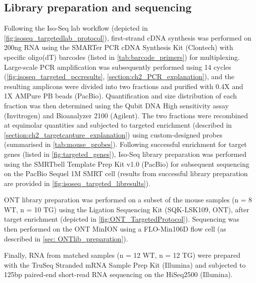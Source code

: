 \subsection{Library preparation and sequencing}
Following the Iso-Seq lab workflow (depicted in \cref{fig:isoseq_targetedlab_protocol}), first-strand cDNA synthesis was performed on 200ng RNA using the SMARTer PCR cDNA Synthesis Kit (Clontech) with specific oligo(dT) barcodes (listed in \cref{tab:barcode_primers}) for multiplexing. Large-scale PCR amplification was subsequently performed using 14 cycles (\cref{fig:isoseq_targeted_pccresults}, \cref{section:ch2_PCR_explanation}), and the resulting amplicons were divided into two fractions and purified with 0.4X and 1X AMPure PB beads (PacBio). Quantification and size distribution of each fraction was then determined using the Qubit DNA High sensitivity assay (Invitrogen) and Bioanalyzer 2100 (Agilent). The two fractions were recombined at equimolar quantities and subjected to targeted enrichment (described in \cref{section:ch2_targetcapture_explanation}) using custom-designed probes (summarised in \cref{tab:mouse_probes}). Following successful enrichment for target genes (listed in \cref{fig:targeted_genes}), Iso-Seq library preparation was performed using the SMRTbell Template Prep Kit v1.0 (PacBio) for subsequent sequencing on the PacBio Sequel 1M SMRT cell (results from successful library preparation are provided in \cref{fig:isoseq_targeted_libresults}). 

ONT library preparation was performed on a subset of the mouse samples (n = 8 WT, n = 10 TG) using the Ligation Sequencing Kit (SQK-LSK109, ONT), after target enrichment (depicted in \cref{fig:ONT_TargetedProtocol}). Sequencing was then performed on the ONT MinION using a FLO-Min106D flow cell (as described in \cref{sec: ONTlib_preparation}).

Finally, RNA from matched samples (n = 12 WT, n = 12 TG) were prepared with the TruSeq Stranded mRNA Sample Prep Kit (Illumina) and subjected to 125bp paired-end short-read RNA sequencing on the HiSeq2500 (Illumina)\cite{Castanho2020}. 

